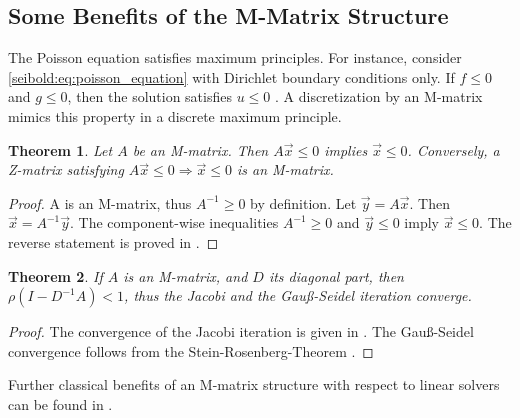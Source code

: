\documentclass[reqno]{amsart}
\theoremstyle{plain}
\newtheorem{thm}{Theorem}
\theoremstyle{definition}
\theoremstyle{remark}
\begin{document}
\subsection{Some Benefits of the M-Matrix Structure}
\label{seibold:subsec:mmatrix_benefits}
The Poisson equation satisfies maximum principles. For instance, consider
\eqref{seibold:eq:poisson_equation} with Dirichlet boundary conditions only.
If $f\le 0$ and $g\le 0$, then the solution satisfies $u\le 0$ \cite{Evans1998}.
A discretization by an M-matrix mimics this property in a discrete maximum
principle.
\begin{thm}
\label{seibold:thm:mmatrix_discrete_max_principle}
Let $A$ be an M-matrix. Then $A\vec{x}\le 0$ implies $\vec{x}\le 0$.
Conversely, a Z-matrix satisfying $A\vec{x}\le 0\Rightarrow\vec{x}\le 0$ is an
M-matrix.
\end{thm}
\begin{proof}
A is an M-matrix, thus $A^{-1}\ge 0$ by definition. Let $\vec{y} = A\vec{x}$.
Then $\vec{x} = A^{-1}\vec{y}$. The component-wise inequalities $A^{-1}\ge 0$
and $\vec{y}\le 0$ imply $\vec{x}\le 0$. The reverse statement is proved in
\cite[p.~29]{QuarteroniSaccoSaleri2000}.
\end{proof}
\begin{thm}
If $A$ is an M-matrix, and $D$ its diagonal part, then $\rho(I-D^{-1}A)<1$,
thus the Jacobi and the Gau{\ss}-Seidel iteration converge.
\end{thm}
\begin{proof}
The convergence of the Jacobi iteration is given in \cite{Hackbusch1994}.
The Gau{\ss}-Seidel convergence follows from the
Stein-Rosenberg-Theorem \cite{Varga2000}.
\end{proof}
Further classical benefits of an M-matrix structure with respect to linear solvers
can be found in \cite{Varga2000}.
\end{document}
